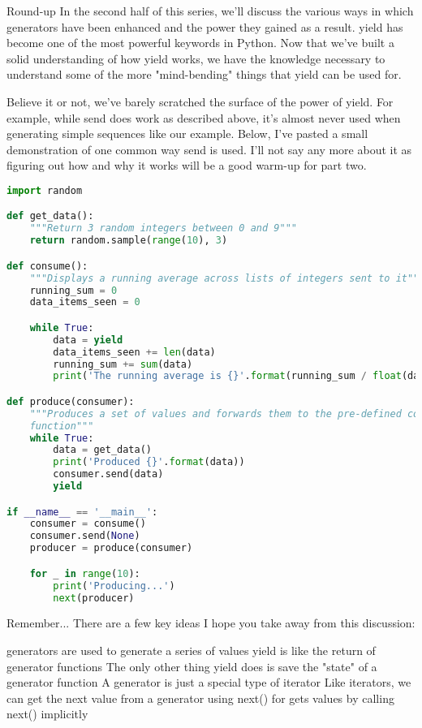 Round-up
In the second half of this series, we'll discuss the various ways in which generators have been enhanced and the power they gained as a result. yield has become one of the most powerful keywords in Python. Now that we've built a solid understanding of how yield works, we have the knowledge necessary to understand some of the more "mind-bending" things that yield can be used for.

Believe it or not, we've barely scratched the surface of the power of yield. For example, while send does work as described above, it's almost never used when generating simple sequences like our example. Below, I've pasted a small demonstration of one common way send is used. I'll not say any more about it as figuring out how and why it works will be a good warm-up for part two.

\begin{lstlisting}[language=Python]
import random

def get_data():
    """Return 3 random integers between 0 and 9"""
    return random.sample(range(10), 3)

def consume():
    """Displays a running average across lists of integers sent to it"""
    running_sum = 0
    data_items_seen = 0

    while True:
        data = yield
        data_items_seen += len(data)
        running_sum += sum(data)
        print('The running average is {}'.format(running_sum / float(data_items_seen)))

def produce(consumer):
    """Produces a set of values and forwards them to the pre-defined consumer
    function"""
    while True:
        data = get_data()
        print('Produced {}'.format(data))
        consumer.send(data)
        yield

if __name__ == '__main__':
    consumer = consume()
    consumer.send(None)
    producer = produce(consumer)

    for _ in range(10):
        print('Producing...')
        next(producer)
\end{lstlisting}

Remember...
There are a few key ideas I hope you take away from this discussion:

generators are used to generate a series of values
yield is like the return of generator functions
The only other thing yield does is save the "state" of a generator function
A generator is just a special type of iterator
Like iterators, we can get the next value from a generator using next()
for gets values by calling next() implicitly

